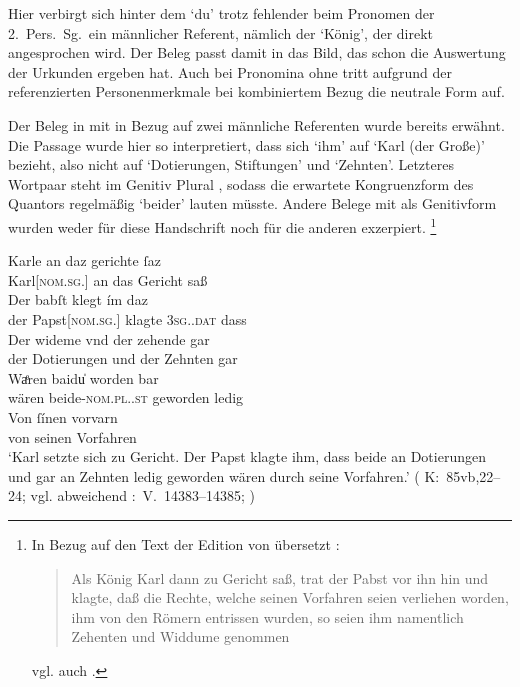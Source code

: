 Hier verbirgt sich hinter dem  `du' trotz fehlender
 beim Pronomen der 2.\ Pers.\ Sg.\ ein männlicher
Referent, nämlich der
 `König', der direkt angesprochen wird. Der Beleg passt damit in
das Bild, das schon die Auswertung der Urkunden ergeben hat. Auch bei
Pro\-nomina ohne  tritt aufgrund der referenzierten
Personenmerkmale bei kombiniertem Bezug die neutrale Form auf.

\label{phsec:babstimbaideu}
Der Beleg in  mit  in Bezug auf zwei
männliche Referenten wurde bereits erwähnt. Die Passage wurde hier so
interpretiert, dass sich  `ihm' auf  `Karl (der
Große)' bezieht, also nicht auf  `Dotierungen, Stiftungen'
\autocite[vgl. zur  Definition][s.\,v.~]{lexer:mhdhwb} und
 `Zehnten'. Letzteres Wortpaar steht im Genitiv Plural
\autocite[vgl.][341]{paul2007}, sodass die erwartete Kongruenzform des
Quantors regelmäßig  `beider' lauten müsste. Andere Belege
mit  als Genitivform wurden weder für diese Handschrift noch für
die anderen exzerpiert.%
%
	\footnote{In Bezug auf den Text der Edition von
	\citet{schroeder1895} übersetzt \citet[249]{mayer1874}:
	\blockquote{Als König Karl dann zu Gericht saß, trat der Pabst vor ihn hin
	und klagte, daß die Rechte, welche seinen Vorfahren seien verliehen worden,
	ihm von den Römern entrissen wurden, so seien ihm namentlich Zehenten und
	Widdume genommen}; vgl. auch \citet[83]{weis2022}.}

\begin{exe}
\ex\label{ex:babstimbaideu}
	\gll Karle an daz gerichte ſaz \\
		Karl[\textsc{nom.sg.\MascM}] an das Gericht saß \\
\sn \gll Der babſt klegt ím daz \\
		der Papst[\textsc{nom.sg.\MascM}] klagte \textsc{3sg.\MascM.dat} dass \\
\sn \gll Der wideme vnd der zehende gar \\
		der Dotierungen und der Zehnten gar \\
\sn \gll Waͤren baidu̍ worden bar \\
		wären beide-\textsc{nom.pl.\NeutM.st} geworden ledig \\
\sn \gll Von ſínen vorvarn \\
		von seinen Vorfahren \\
	\trans `Karl setzte sich zu Gericht. Der Papst klagte ihm, dass
		 beide an Dotierungen und gar an Zehnten ledig geworden
		wären durch seine Vorfahren.'
		(%
			K:~85vb,22--24; vgl. abweichend
			\KC:~V.~14383--14385;
			\cite[341]{schroeder1895}%
		)
\end{exe}

